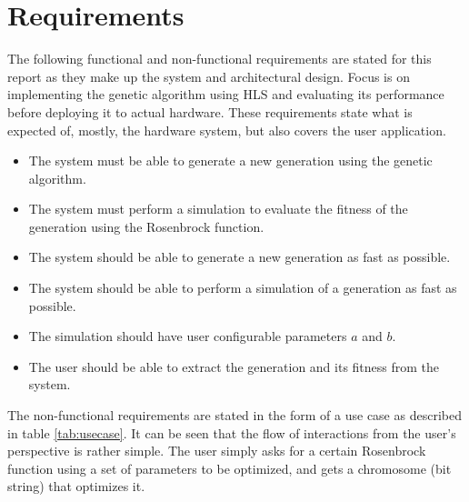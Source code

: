 \section{Requirements}\label{sec:req}

The following functional and non-functional requirements are stated for this report as they make up the system and architectural design. Focus is on implementing the genetic algorithm using HLS and evaluating its performance before deploying it to actual hardware. These requirements state what is expected of, mostly, the hardware system, but also covers the user application.

\begin{itemize}
\item The system must be able to generate a new generation using the genetic algorithm.
\item The system must perform a simulation to evaluate the fitness of the generation using the Rosenbrock function.
\item The system should be able to generate a new generation as fast as possible.
\item The system should be able to perform a simulation of a generation as fast as possible.
\item The simulation should have user configurable parameters $a$ and $b$.
\item The user should be able to extract the generation and its fitness from the system.
\end{itemize}

The non-functional requirements are stated in the form of a use case as described in table \ref{tab:usecase}. It can be seen that the flow of interactions from the user's perspective is rather simple. The user simply asks for a certain Rosenbrock function using a set of parameters to be optimized, and gets a chromosome (bit string) that optimizes it.

